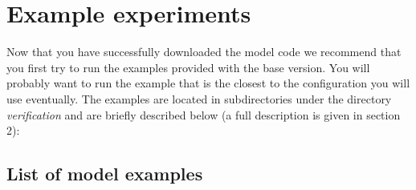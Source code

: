 \section{Example experiments}
\label{sect:modelExamples}

Now that you have successfully downloaded the model code we recommend that
you first try to run the examples provided with the base version. You will
probably want to run the example that is the closest to the configuration
you will use eventually. The examples are located in subdirectories under
the directory \textit{verification} and are briefly described below (a full
description is given in section 2):

\subsection{List of model examples}

